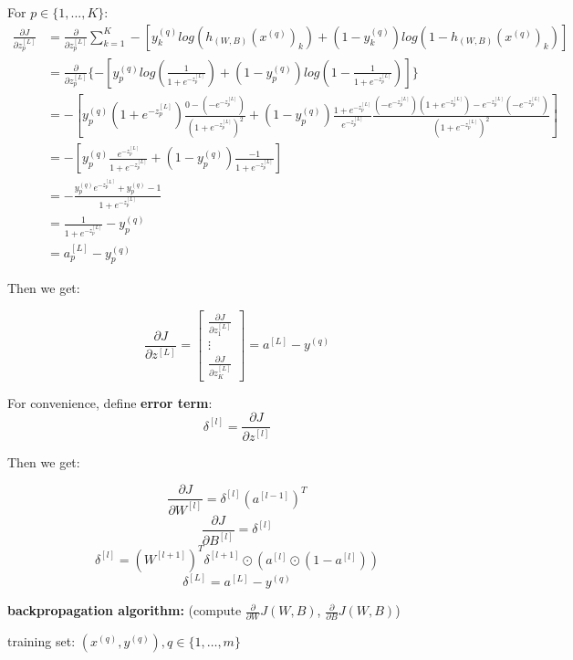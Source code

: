 \documentclass{article}
\begin{document}
\noindent For \(p \in \{1, ..., K\}\):
\begin{equation*}
\begin{split}
\frac{\partial J}{\partial z_p^{[L]}} 
& = \frac{\partial}{\partial z_p^{[L]}} \sum_{k = 1}^{K} -[y^{(q)}_k log(h_{(W, B)} (x^{(q)})_k) + (1 - y^{(q)}_k) log(1 - h_{(W, B)}(x^{(q)})_k)] \\
& = \frac{\partial}{\partial z_p^{[L]}} \{-[y^{(q)}_p log(\frac{1}{1 + e^{-z_p^{[L]}}}) + (1 - y^{(q)}_p) log(1 - \frac{1}{1 + e^{-z_p^{[L]}}})]\} \\
& = - [y^{(q)}_p (1 + e^{-z_p^{[L]}}) \frac{0 - (-e^{-z_p^{[L]}})}{(1 + e^{-z_p^{[L]}})^2} + (1 - y^{(q)}_p) \frac{1 + e^{-z_p^{[L]}}}{e^{-z_p^{[L]}}} \frac{(-e^{-z_p^{[L]}})(1 + e^{-z_p^{[L]}}) - e^{-z_p^{[L]}}(-e^{-z_p^{[L]}})}{(1 + e^{-z_p^{[L]}})^2}] \\
& = - [y_p^{(q)} \frac{e^{-z_p^{[L]}}}{1 + e^{-z_p^{[L]}}} + (1 - y_p^{(q)}) \frac{-1}{1 + e^{-z_p^{[L]}}}] \\
& = - \frac{y_p^{(q)}e^{-z_p^{[L]}} + y_p^{(q)} - 1}{1 + e^{-z_p^{[L]}}} \\
& = \frac{1}{1 + e^{-z_p^{[L]}}} - y_p^{(q)} \\ 
& = a_p^{[L]} - y_p^{(q)}
\end{split}
\end{equation*}

\noindent Then we get:

\[\frac{\partial J}{\partial z^{[L]}} = 
\begin{bmatrix}
\frac{\partial J}{\partial z_1^{[L]}} \\
\vdots \\
\frac{\partial J}{\partial z_K^{[L]}}
\end{bmatrix}
= a^{[L]} - y^{(q)}
\]

\noindent For convenience, define \textbf{error term}: 
\[\delta^{[l]} = \frac{\partial J}{\partial z^{[l]}}\]

\noindent Then we get:

\[\frac{\partial J}{\partial W^{[l]}} = \delta^{[l]} (a^{[l - 1]})^T\]
\[\frac{\partial J}{\partial B^{[l]}} = \delta^{[l]}\]
\[\delta^{[l]} = (W^{[l + 1]})^T \delta^{[l + 1]} \odot (a^{[l]} \odot (1 - a^{[l]}))\]
\[\delta^{[L]} = a^{[L]} - y^{(q)}\]

\noindent \textbf{backpropagation algorithm:} (compute \(\frac{\partial}{\partial W} J(W, B)\), \(\frac{\partial}{\partial B} J(W, B)\))

\noindent training set: \((x^{(q)}, y^{(q)}), q \in \{1, \dots, m\}\)
\end{document}
